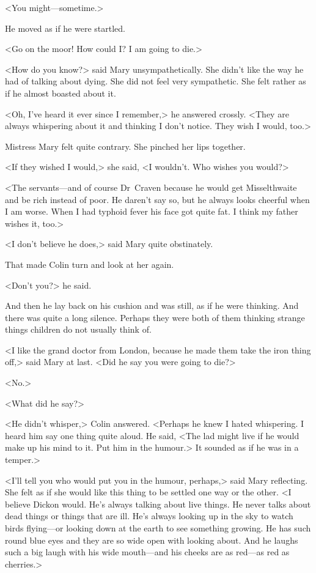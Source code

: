 <You might—sometime.>

He moved as if he were startled.

<Go on the moor! How could I\@? I am going to die.>

<How do you know?> said Mary unsympathetically. She didn't like the way he had of talking about dying. She did not feel very sympathetic. She felt rather as if he almost boasted about it.

<Oh, I've heard it ever since I remember,> he answered crossly. <They are always whispering about it and thinking I don't notice. They wish I would, too.>

Mistress Mary felt quite contrary. She pinched her lips together.

<If they wished I would,> she said, <I wouldn't. Who wishes you would?>

<The servants—and of course Dr~Craven because he would get Misselthwaite and be rich instead of poor. He daren't say so, but he always looks cheerful when I am worse. When I had typhoid fever his face got quite fat. I think my father wishes it, too.>

<I don't believe he does,> said Mary quite obstinately.

That made Colin turn and look at her again.

<Don't you?> he said.

And then he lay back on his cushion and was still, as if he were thinking. And there was quite a long silence. Perhaps they were both of them thinking strange things children do not usually think of.

<I like the grand doctor from London, because he made them take the iron thing off,> said Mary at last. <Did he say you were going to die?>

<No.>

<What did he say?>

<He didn't whisper,> Colin answered. <Perhaps he knew I hated whispering. I heard him say one thing quite aloud. He said, <The lad might live if he would make up his mind to it. Put him in the humour.> It sounded as if he was in a temper.>

<I'll tell you who would put you in the humour, perhaps,> said Mary reflecting. She felt as if she would like this thing to be settled one way or the other. <I believe Dickon would. He's always talking about live things. He never talks about dead things or things that are ill. He's always looking up in the sky to watch birds flying—or looking down at the earth to see something growing. He has such round blue eyes and they are so wide open with looking about. And he laughs such a big laugh with his wide mouth—and his cheeks are as red—as red as cherries.>

